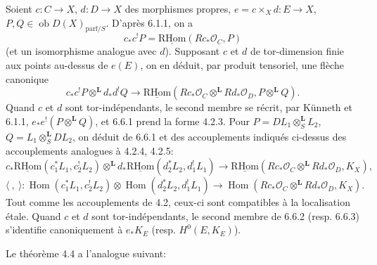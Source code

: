 \documentclass[11pt]{article}
\providecommand{\cO}{\mathcal{O}}
\DeclareMathOperator{\Hom}{Hom}
\providecommand{\RHom}{\mathrm{RHom}}
\providecommand{\uRHom}{\underline{\RHom}}
\providecommand{\RHom}{\mathrm{RHom}}
\providecommand{\Hom}{\operatorname{Hom}}
\providecommand{\RHom}{\mathrm R\mathcal{H}om}
\providecommand{\RHom}{\mathrm{RHom}}
\providecommand{\Hom}{\operatorname{Hom}}
\begin{document}
Soient $c:C\to X$, $d:D\to X$ des morphismes propres, $e=c\times_Xd:E\to X$, $P,Q\in\operatorname{ob}D(X)_{\mathrm{parf}/S}$. D'après 6.1.1, on a
\[
c_*c^!P=\uRHom(Rc_*\cO_C,P)
\]
(et un isomorphisme analogue avec $d$). Supposant $c$ et $d$ de tor-dimension finie aux points au-dessus de $e(E)$, on en déduit, par produit tensoriel, une flèche canonique
\begin{equation}
\tag{6.6.1}
c_*c^!P\otimes^{\mathbf L}d_*d^!Q\longrightarrow
\uRHom(Rc_*\cO_C\otimes^{\mathbf L}Rd_*\cO_D,P\otimes^{\mathbf L}Q).
\end{equation}
Quand $c$ et $d$ sont tor-indépendants, le second membre se récrit, par Künneth et 6.1.1, $e_*e^!(P\otimes^{\mathbf L}Q)$, et 6.6.1 prend la forme 4.2.3. Pour $P=DL_1\otimes_S^{\mathbf L}L_2$, $Q=L_1\otimes_S^{\mathbf L}DL_2$, on déduit de 6.6.1 et des accouplements indiqués ci-dessus des accouplements analogues à 4.2.4, 4.2.5:
\begin{equation}
\tag{6.6.2}
c_*\uRHom(c_1^*L_1,c_2^!L_2)\otimes^{\mathbf L}d_*\uRHom(d_2^*L_2,d_1^!L_1)
\longrightarrow\uRHom(Rc_*\cO_C\otimes^{\mathbf L}Rd_*\cO_D,K_X),
\end{equation}
\begin{equation}
\tag{6.6.3}
\langle\ ,\ \rangle:\Hom(c_1^*L_1,c_2^!L_2)\otimes\Hom(d_2^*L_2,d_1^!L_1)
\longrightarrow\Hom(Rc_*\cO_C\otimes^{\mathbf L}Rd_*\cO_D,K_X).
\end{equation}
Tout comme les accouplements de 4.2, ceux-ci sont compatibles à la localisation étale. Quand $c$ et $d$ sont tor-indépendants, le second membre de 6.6.2 (resp. 6.6.3) s'identifie canoniquement à $e_*K_E$ (resp. $H^0(E,K_E)$).

Le théorème 4.4 a l'analogue suivant:
\end{document}
